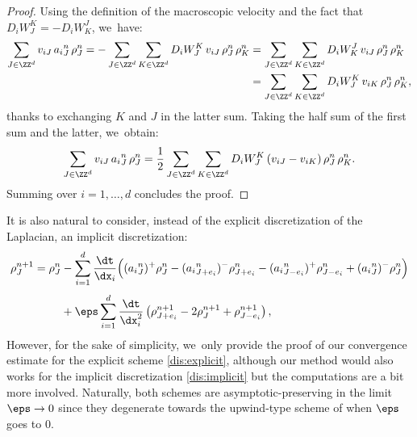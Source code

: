 \begin{proof}
Using the definition of the macroscopic velocity and the fact that $D_iW_{J}^{K} = -D_iW^{J}_{K}$, we~have:
\begin{align*}
\sum_{J\in \ZZ^d} v_{iJ} \, {a_i}^n_{J} \, \rho_{J}^n = - \sum_{J\in \ZZ^d} \sum_{K\in \ZZ^d} D_iW_J^K \, v_{iJ} \, \rho_{J}^n \, \rho_{K}^n & = \sum_{J\in \ZZ^d} \sum_{K\in \ZZ^d} D_iW_K^J \, v_{iJ} \, \rho_{J}^n \, \rho_{K}^n \\
& = \sum_{J\in \ZZ^d} \sum_{K\in \ZZ^d} D_iW_J^K \, v_{iK} \, \rho_{J}^n \, \rho_{K}^n,
\end{align*}
thanks to exchanging $K$ and $J$ in the latter sum. Taking the half sum of the first sum and the latter, we~obtain:
\[
\sum_{J\in \ZZ^d} v_{iJ} \, {a_i}^n_{J} \, \rho_{J}^n = \frac 12 \sum_{J\in \ZZ^d} \sum_{K\in \ZZ^d} D_iW_J^K \, (v_{iJ} - v_{iK}) \, \rho_{J}^n \, \rho_{K}^n.
\]
Summing over $i=1, \ldots, d$ concludes the proof.
\end{proof}
It is also natural to consider, instead of the explicit discretization of the Laplacian, an implicit discretization:
\begin{align}\label{dis:implicit}
\rho_{J}^{n+1} = \rho_{J}^n &- \sum_{i=1}^{d} \frac{\dt}{\dx_i}
\Big(({a_i}^n_{J})^+ \rho_{J}^n - ({a_i}^n_{J+e_i})^- \rho_{J+e_i}^n
-({a_i}^n_{J-e_i})^+ \rho_{J-e_i}^n + ({a_i}^n_{J})^- \rho_{J}^n \Big)\notag \\[-5pt]
\\[-8pt]
& + \eps \sum_{i=1}^{d} \frac{\dt}{\dx_i^2} \left(\rho_{J+e_i}^{n+1} - 2\rho_J^{n+1} + \rho_{J-e_i}^{n+1} \right),\notag
\end{align}
However, for the sake of simplicity, we~only provide the proof of our convergence estimate for the explicit scheme \eqref{dis:explicit}, although our method would also works for the implicit discretization \eqref{dis:implicit} but the computations are a bit more involved. Naturally, both schemes are asymptotic-preserving in the limit $\eps \to 0$ since they degenerate towards the upwind-type scheme of \cite{dlv20} when $\eps$ goes to 0.

